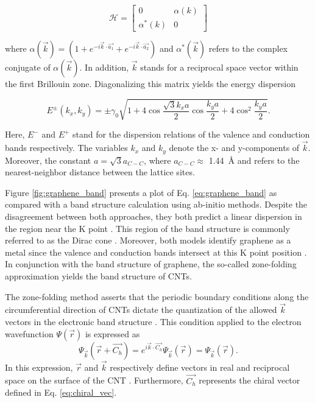 \begin{equation}
	\mathcal{H} = \begin{bmatrix} 
	0 & \alpha(k) \\
	\alpha^*(k) & 0
	\end{bmatrix}
\end{equation}

where $\alpha(\vec{k}) = (1 + e^{-i \vec{k}\cdot \vec{a_1}} + e^{-i \vec{k}\cdot \vec{a_2}})$ and $\alpha^*(\vec{k})$ refers to the complex conjugate of $\alpha(\vec{k})$\cite{charlier2007electronic}. In addition, $\vec{k}$ stands for a reciprocal space vector within the first Brillouin zone. Diagonalizing this matrix yields the energy dispersion 

\begin{equation}
	E^{\pm} (k_x, k_y) = \pm \gamma_0 \sqrt{1 + 4 \cos\dfrac{\sqrt{3}k_x a}{2}\cos\dfrac{k_y a}{2} + 4 \cos^2 \dfrac{k_y a}{2}}.
	\label{eq:graphene_band}
\end{equation} 

 Here, $E^-$ and $E^+$ stand for the dispersion relations of the valence and conduction bands respectively. The variables $k_x$ and $k_y$ denote the x- and y-components of $\vec{k}$. Moreover, the constant $a = \sqrt{3}a_{C-C}$, where $a_{C-C} \approx$ \SI{1.44}{\angstrom} and refers to the nearest-neighbor distance between the lattice sites. 

Figure \ref{fig:graphene_band} presents a plot of Eq. \ref{eq:graphene_band} as compared with a band structure calculation using ab-initio methods. Despite the disagreement between both approaches, they both predict a linear dispersion in the region near the K point \cite{charlier2007electronic}. This region of the band structure is commonly referred to as the Dirac cone	\cite{charlier2007electronic}. Moreover, both models identify graphene as a metal since the valence and conduction bands intersect at this K point position \cite{charlier2007electronic}. In conjunction with the band structure of graphene, the so-called zone-folding approximation yields the band structure of CNTs. 

The zone-folding method asserts that the periodic boundary conditions along the circumferential direction of CNTs dictate the quantization of the allowed $\vec{k}$ vectors in the electronic band structure \cite{charlier2007electronic}. This condition applied to the electron wavefunction $\Psi(\vec{r})$ is expressed as 
\begin{equation}
 \Psi_{\vec{k}}(\vec{r} + \vec{C_h}) = e^{i \vec{k} \cdot \vec{C_h}} \Psi_{\vec{k}}(\vec{r}) = \Psi_{\vec{k}}(\vec{r}).
 \label{eq:boundary_cond}
\end{equation}
In this expression, $\vec{r}$ and $\vec{k}$ respectively define vectors in real and reciprocal space on the surface of the CNT \cite{charlier2007electronic}. Furthermore, $\vec{C_h}$ represents the chiral vector defined in Eq. \ref{eq:chiral_vec}. 

